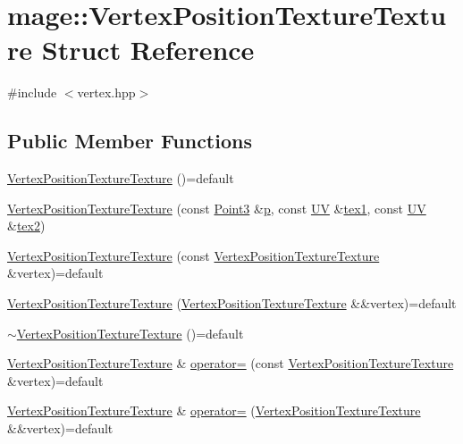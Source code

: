 \hypertarget{structmage_1_1_vertex_position_texture_texture}{}\section{mage\+:\+:Vertex\+Position\+Texture\+Texture Struct Reference}
\label{structmage_1_1_vertex_position_texture_texture}


{\ttfamily \#include $<$vertex.\+hpp$>$}

\subsection*{Public Member Functions}
\begin{DoxyCompactItemize}
\item 
\hyperlink{structmage_1_1_vertex_position_texture_texture_a4dd987362b64d278569f9bd043e2cb8b}{Vertex\+Position\+Texture\+Texture} ()=default
\item 
\hyperlink{structmage_1_1_vertex_position_texture_texture_a7f7d47e614c6eafddc6fa63f47a0b7c1}{Vertex\+Position\+Texture\+Texture} (const \hyperlink{structmage_1_1_point3}{Point3} \&\hyperlink{structmage_1_1_vertex_position_texture_texture_aed106149eda65a20e60ebc3b93535270}{p}, const \hyperlink{structmage_1_1_u_v}{UV} \&\hyperlink{structmage_1_1_vertex_position_texture_texture_a96be20a1f6ec9b9b74875099eef80f08}{tex1}, const \hyperlink{structmage_1_1_u_v}{UV} \&\hyperlink{structmage_1_1_vertex_position_texture_texture_a5a41669f18385d932c1490ff20c80bed}{tex2})
\item 
\hyperlink{structmage_1_1_vertex_position_texture_texture_a753bdeb0b5b4ea7fff5bdd4ae21a0c16}{Vertex\+Position\+Texture\+Texture} (const \hyperlink{structmage_1_1_vertex_position_texture_texture}{Vertex\+Position\+Texture\+Texture} \&vertex)=default
\item 
\hyperlink{structmage_1_1_vertex_position_texture_texture_abd23d266932ec6f8c830b804a25a1fe5}{Vertex\+Position\+Texture\+Texture} (\hyperlink{structmage_1_1_vertex_position_texture_texture}{Vertex\+Position\+Texture\+Texture} \&\&vertex)=default
\item 
\hyperlink{structmage_1_1_vertex_position_texture_texture_a861ed56f084a3385429eae5783178529}{$\sim$\+Vertex\+Position\+Texture\+Texture} ()=default
\item 
\hyperlink{structmage_1_1_vertex_position_texture_texture}{Vertex\+Position\+Texture\+Texture} \& \hyperlink{structmage_1_1_vertex_position_texture_texture_a6880fca48f99b6a3360a41f05ca7f9fc}{operator=} (const \hyperlink{structmage_1_1_vertex_position_texture_texture}{Vertex\+Position\+Texture\+Texture} \&vertex)=default
\item 
\hyperlink{structmage_1_1_vertex_position_texture_texture}{Vertex\+Position\+Texture\+Texture} \& \hyperlink{structmage_1_1_vertex_position_texture_texture_a4e6539fcab28def222ec66a3162b8cd9}{operator=} (\hyperlink{structmage_1_1_vertex_position_texture_texture}{Vertex\+Position\+Texture\+Texture} \&\&vertex)=default
\end{DoxyCompactItemize}
